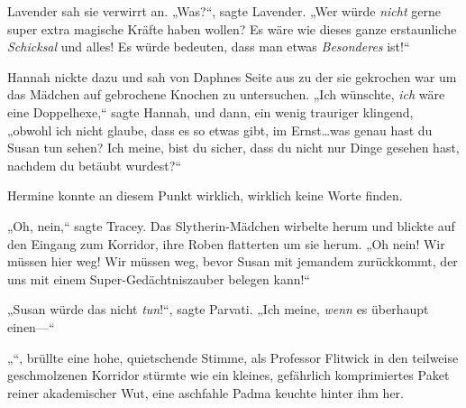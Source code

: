 Lavender sah sie verwirrt an. „Was?“, sagte Lavender. „Wer würde \emph{nicht} gerne super extra magische Kräfte haben wollen? Es wäre wie dieses ganze erstaunliche \emph{Schicksal} und alles! Es würde bedeuten, dass man etwas \emph{Besonderes} ist!“

Hannah nickte dazu und sah von Daphnes Seite aus zu der sie gekrochen war um das Mädchen auf gebrochene Knochen zu untersuchen. „Ich wünschte, \emph{ich} wäre eine Doppelhexe,“ sagte Hannah, und dann, ein wenig trauriger klingend, „obwohl ich nicht glaube, dass es so etwas gibt, im Ernst…was genau hast du Susan tun sehen? Ich meine, bist du sicher, dass du nicht nur Dinge gesehen hast, nachdem du betäubt wurdest?“

Hermine konnte an diesem Punkt wirklich, wirklich keine Worte finden.

„Oh, nein,“ sagte Tracey. Das Slytherin-Mädchen wirbelte herum und blickte auf den Eingang zum Korridor, ihre Roben flatterten um sie herum. „Oh nein! Wir müssen hier weg! Wir müssen weg, bevor Susan mit jemandem zurückkommt, der uns mit einem Super-Gedächtniszauber belegen kann!“

„Susan würde das nicht \emph{tun}!“, sagte Parvati. „Ich meine, \emph{wenn} es überhaupt einen—“

„“, brüllte eine hohe, quietschende Stimme, als Professor Flitwick in den teilweise geschmolzenen Korridor stürmte wie ein kleines, gefährlich komprimiertes Paket reiner akademischer Wut, eine aschfahle Padma keuchte hinter ihm her.

